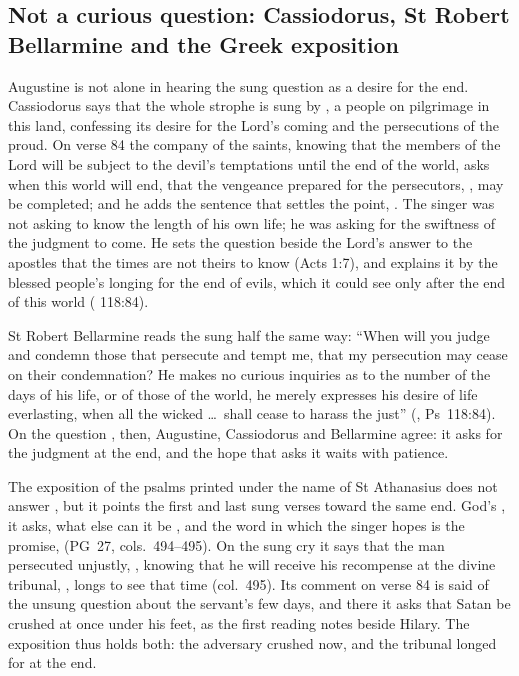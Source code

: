 \subsection{Not a curious question: Cassiodorus, St Robert Bellarmine and the Greek exposition}

Augustine is not alone in hearing the sung question as a desire for the end.
Cassiodorus says that the whole strophe is sung by , a people on pilgrimage in this land, confessing its desire for the
Lord's coming and the persecutions of the proud. On verse 84 the company of the
saints, knowing that the members of the Lord will be subject to the devil's
temptations until the end of the world, asks when this world will end, that the
vengeance prepared for the persecutors, , may
be completed; and he adds the sentence that settles the point, .
The singer was not asking to know the length of his own life; he was asking for
the swiftness of the judgment to come. He sets the question beside the Lord's
answer to the apostles that the times are not theirs to know (Acts 1:7), and
explains it by the blessed people's longing for the end of evils, which it could
see only after the end of this world ( 118:84).

St Robert Bellarmine reads the sung half the same way: ``When will you judge and
condemn those that persecute and tempt me, that my persecution may cease on their
condemnation? He makes no curious inquiries as to the number of the days of his
life, or of those of the world, he merely expresses his desire of life
everlasting, when all the wicked \dots\ shall cease to harass the just''
(, Ps~118:84). On the question ,
then, Augustine, Cassiodorus and Bellarmine agree: it asks for the judgment at the
end, and the hope that asks it waits with patience.

The exposition of the psalms printed under the name of St Athanasius does not
answer , but it points the first and last sung verses toward the
same end. God's , it asks, what else can it be , and the word in which the singer hopes is the promise,
 (PG~27, cols.~494--495). On the sung cry  it says that the man persecuted unjustly, , knowing that he will receive his recompense
at the divine tribunal, , longs to see that time
(col.~495). Its comment on verse 84 is said of the unsung question about the
servant's few days, and there it asks that Satan be crushed at once under his
feet, as the first reading notes beside Hilary. The exposition thus holds both:
the adversary crushed now, and the tribunal longed for at the end.

